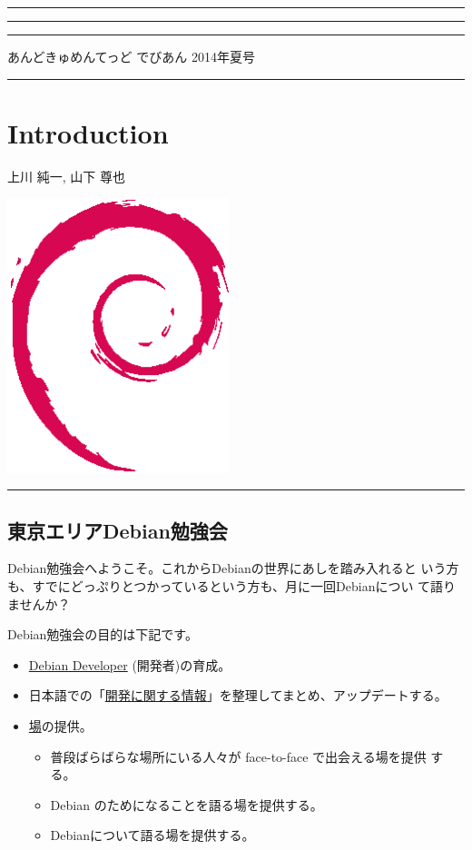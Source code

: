 \documentclass[mingoth,a4paper]{jsarticle}
\renewcommand{\dancersection}[2]{%
\newpage
あんどきゅめんてっど でびあん 2014年夏号
%
\vspace{0.1mm}\\
{\color{dancerdarkblue}\rule{\hsize}{2mm}}

%
%
\begin{minipage}[t]{0.6\hsize}
\color{dancerdarkblue}
\vspace{1cm}
\section{#1}
\hfill{}#2\\
\end{minipage}
\begin{minipage}[t]{0.4\hsize}
\vspace{-2cm}
\hfill{}\includegraphics[height=8cm]{image200502/openlogo-nd.eps}\\
\vspace{-5cm}
\end{minipage}
%
{\color{dancerlightblue}\rule{0.66\hsize}{2mm}}
%
\vspace{2cm}
}
\begin{document}
\setcounter{page}{1}
\begin{minipage}[]{0.2\hsize}
 \colorbox{dancerlightblue}{}
\end{minipage}
\begin{minipage}[]{0.8\hsize}
\hrule
\vspace{1mm}
\hrule
\setcounter{tocdepth}{1}
{\small
\begin{multicols}{2}
  \tableofcontents
\end{multicols}
} %
\vspace{1mm}
\hrule
\vspace{3cm}

\end{minipage}

\dancersection{Introduction}{上川 純一, 山下 尊也}

\subsection{東京エリアDebian勉強会}

 Debian勉強会へようこそ。これからDebianの世界にあしを踏み入れると
 いう方も、すでにどっぷりとつかっているという方も、月に一回Debianについ
 て語りませんか？

 Debian勉強会の目的は下記です。

\begin{itemize}
 \item \underline{Debian Developer} (開発者)の育成。
 \item 日本語での「\underline{開発に関する情報}」を整理してまとめ、アップデートする。
 \item \underline{場}の提供。
 \begin{itemize}
  \item 普段ばらばらな場所にいる人々が face-to-face で出会える場を提供
	する。
  \item Debian のためになることを語る場を提供する。
  \item Debianについて語る場を提供する。
 \end{itemize}
\end{itemize}
\end{document}
